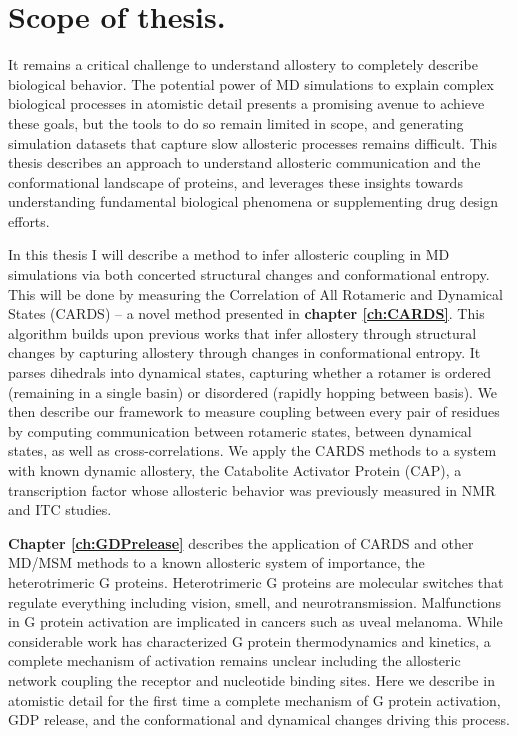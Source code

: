 \documentclass[../main.tex]{subfiles}
\begin{document}
\section{Scope of thesis.}
	It remains a critical challenge to understand allostery to completely describe biological behavior. The potential power of MD simulations to explain complex biological processes in atomistic detail presents a promising avenue to achieve these goals, but the tools to do so remain limited in scope, and generating simulation datasets that capture slow allosteric processes remains difficult. This thesis describes an approach to understand allosteric communication and the conformational landscape of proteins, and leverages these insights towards understanding fundamental biological phenomena or supplementing drug design efforts.

	In this thesis I will describe a method to infer allosteric coupling in MD simulations via both concerted structural changes and conformational entropy. This will be done by measuring the Correlation of All Rotameric and Dynamical States (CARDS) – a novel method presented in \textbf{chapter \ref{ch:CARDS}}. This algorithm builds upon previous works that infer allostery through structural changes by capturing allostery through changes in conformational entropy. It parses dihedrals into dynamical states, capturing whether a rotamer is ordered (remaining in a single basin) or disordered (rapidly hopping between basis). We then describe our framework to measure coupling between every pair of residues by computing communication between rotameric states, between dynamical states, as well as cross-correlations. We apply the CARDS methods to a system with known dynamic allostery, the Catabolite Activator Protein (CAP), a transcription factor whose allosteric behavior was previously measured in NMR and ITC studies.

	\textbf{Chapter \ref{ch:GDPrelease}} describes the application of CARDS and other MD/MSM methods to a known allosteric system of importance, the heterotrimeric G proteins. Heterotrimeric G proteins are molecular switches that regulate everything including vision, smell, and neurotransmission. Malfunctions in G protein activation are implicated in cancers such as uveal melanoma.  While considerable work has characterized G protein thermodynamics and kinetics, a complete mechanism of activation remains unclear including the allosteric network coupling the receptor and nucleotide binding sites. Here we describe in atomistic detail for the first time a complete mechanism of G protein activation, GDP release, and the conformational and dynamical changes driving this process. 
\end{document}
